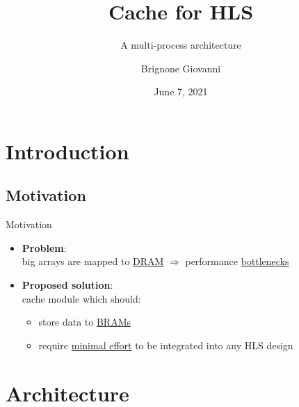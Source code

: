 \documentclass{beamer}
\title{Cache for HLS}
\subtitle{A multi-process architecture}
\author{Brignone Giovanni}
\date{June 7, 2021}
\begin{document}
\begin{frame}
	\maketitle
\end{frame}

\section{Introduction}
\subsection{Motivation}
\begin{frame}{Motivation}
	\begin{itemize}
		\item \textbf{Problem}:\\
			big arrays are mapped to \underline{DRAM} $\Rightarrow$
			performance \underline{bottlenecks}
		\item \textbf{Proposed solution}:\\
			cache module which should:
			\begin{itemize}
				\item store data to \underline{BRAMs}
				\item require \underline{minimal effort} to be
					integrated into any HLS design
			\end{itemize}
	\end{itemize}
\end{frame}

\section{Architecture}
\end{document}

